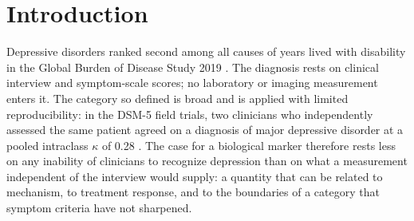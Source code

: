 \section{Introduction}
\label{sec:intro}


Depressive disorders ranked second among all causes of years lived with disability in the Global
Burden of Disease Study 2019 \citep{gbd2019mental}. The diagnosis rests on clinical interview and
symptom-scale scores; no laboratory or imaging measurement enters it. The category so defined is
broad and is applied with limited reproducibility: in the DSM-5 field trials, two clinicians who
independently assessed the same patient agreed on a diagnosis of major depressive disorder at a
pooled intraclass $\kappa$ of 0.28 \citep{regier2013dsm5}. The case for a biological
marker therefore rests less on any inability of clinicians to recognize depression than on what a
measurement independent of the interview would supply: a quantity that can be related to mechanism,
to treatment response, and to the boundaries of a category that symptom criteria have not sharpened.


